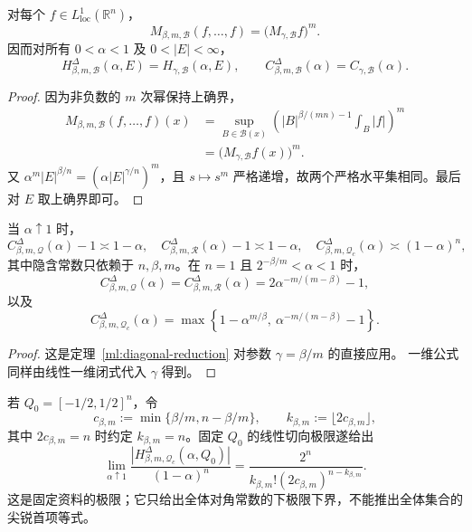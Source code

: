 \begin{theorem}[精确对角约化]\label{ml:diagonal-reduction}
对每个 $f\in L^1_{\mathrm{loc}}(\mathbb R^n)$，
\[
 M_{\beta,m,\mathcal B}(f,\ldots,f)
 =\bigl(M_{\gamma,\mathcal B}f\bigr)^m.
\]
因而对所有 $0<\alpha<1$ 及 $0<|E|<\infty$，
\[
 H^{\Delta}_{\beta,m,\mathcal B}(\alpha,E)
 =H_{\gamma,\mathcal B}(\alpha,E),
 \qquad
 C^{\Delta}_{\beta,m,\mathcal B}(\alpha)
 =C_{\gamma,\mathcal B}(\alpha).
\]
\end{theorem}

\begin{proof}
因为非负数的 $m$ 次幂保持上确界，
\[
 \begin{split}
 M_{\beta,m,\mathcal B}(f,\ldots,f)(x)
 &=\sup_{B\in\mathcal B(x)}
 \left(|B|^{\beta/(mn)-1}\int_B|f|\right)^m\\
 &=\bigl(M_{\gamma,\mathcal B}f(x)\bigr)^m.
 \end{split}
\]
又 $\alpha^m|E|^{\beta/n}=(\alpha|E|^{\gamma/n})^m$，且 $s\mapsto s^m$
严格递增，故两个严格水平集相同。最后对 $E$ 取上确界即可。
\end{proof}

\begin{corollary}[对角模型的端点结论]\label{ml:diagonal-endpoint}
当 $\alpha\uparrow1$ 时，
\[
 C^{\Delta}_{\beta,m,\mathcal Q}(\alpha)-1\asymp 1-\alpha,
 \quad
 C^{\Delta}_{\beta,m,\mathcal R}(\alpha)-1\asymp 1-\alpha,
 \quad
 C^{\Delta}_{\beta,m,\mathcal Q_c}(\alpha)\asymp(1-\alpha)^n,
\]
其中隐含常数只依赖于 $n,\beta,m$。在 $n=1$ 且
$2^{-\beta/m}<\alpha<1$ 时，
\[
 C^{\Delta}_{\beta,m,\mathcal Q}(\alpha)
 =C^{\Delta}_{\beta,m,\mathcal R}(\alpha)
 =2\alpha^{-m/(m-\beta)}-1,
\]
以及
\[
 C^{\Delta}_{\beta,m,\mathcal Q_c}(\alpha)
 =\max\left\{1-\alpha^{m/\beta},\
                 \alpha^{-m/(m-\beta)}-1\right\}.
\]
\end{corollary}

\begin{proof}
这是定理~\ref{ml:diagonal-reduction} 对参数 $\gamma=\beta/m$ 的直接应用。
一维公式同样由线性一维闭式代入 $\gamma$ 得到。
\end{proof}

若 $Q_0=[-1/2,1/2]^n$，令
\[
 c_{\beta,m}:=\min\{\beta/m,n-\beta/m\},\qquad
 k_{\beta,m}:=\lfloor2c_{\beta,m}\rfloor,
\]
其中 $2c_{\beta,m}=n$ 时约定 $k_{\beta,m}=n$。固定 $Q_0$ 的线性切向极限遂给出
\[
 \lim_{\alpha\uparrow1}
 \frac{|H^{\Delta}_{\beta,m,\mathcal Q_c}(\alpha,Q_0)|}{(1-\alpha)^n}
 =\frac{2^n}{k_{\beta,m}!(2c_{\beta,m})^{n-k_{\beta,m}}}.
\]
这是固定资料的极限；它只给出全体对角常数的下极限下界，不能推出全体集合的
尖锐首项等式。

